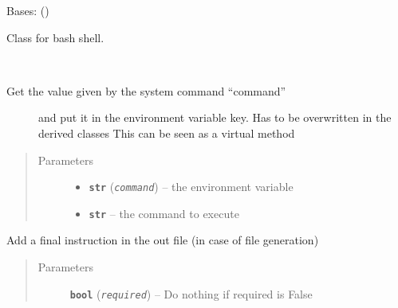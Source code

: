 \documentclass[a4paper,10pt,english]{sphinxmanual}
\begin{document}
\begin{fulllineitems}
\label{commands/apidoc/src:src.fileEnviron.BashFileEnviron}
Bases: {\hyperref[commands/apidoc/src:src.fileEnviron.FileEnviron]{}} ()

Class for bash shell.

\begin{fulllineitems}
\label{commands/apidoc/src:src.fileEnviron.BashFileEnviron.command_value}~\begin{description}
\item[{Get the value given by the system command ``command'' }] \leavevmode
and put it in the environment variable key.
Has to be overwritten in the derived classes
This can be seen as a virtual method

\end{description}
\begin{quote}\begin{description}
\item[{Parameters}] \leavevmode\begin{itemize}
\item {} 
\textbf{\texttt{str}} (\emph{\texttt{command}}) -- the environment variable

\item {} 
\textbf{\texttt{str}} -- the command to execute

\end{itemize}

\end{description}\end{quote}

\end{fulllineitems}


\begin{fulllineitems}
\label{commands/apidoc/src:src.fileEnviron.BashFileEnviron.finish}
Add a final instruction in the out file (in case of file generation)
\begin{quote}\begin{description}
\item[{Parameters}] \leavevmode
\textbf{\texttt{bool}} (\emph{\texttt{required}}) -- Do nothing if required is False


\end{description}
\end{quote}
\end{fulllineitems}
\end{fulllineitems}
\end{document}
